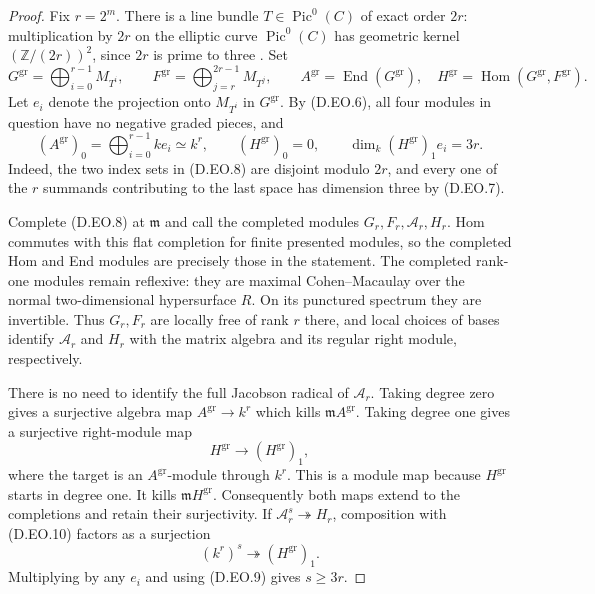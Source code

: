\begin{proof}
Fix $r=2^m$. There is a line bundle $T\in\operatorname{Pic}^0(C)$
of exact order $2r$: multiplication by $2r$ on the elliptic curve
$\operatorname{Pic}^0(C)$ has geometric kernel
$(\mathbb Z/(2r))^2$, since $2r$ is prime to three
\citep[Tag 03RP, Proposition 39.9.11(5)--(7), with proof]{StacksDEllipticOrder}.
Set
\[
 G^{\mathrm{gr}}=\bigoplus_{i=0}^{r-1}M_{T^i},
 \qquad F^{\mathrm{gr}}=\bigoplus_{j=r}^{2r-1}M_{T^j},
 \qquad A^{\mathrm{gr}}=\operatorname{End}(G^{\mathrm{gr}}),
 \quad H^{\mathrm{gr}}=\operatorname{Hom}(G^{\mathrm{gr}},F^{\mathrm{gr}}).
 \tag{D.EO.8}
\]
Let $e_i$ denote the projection onto $M_{T^i}$ in $G^{\mathrm{gr}}$.
By (D.EO.6), all four modules in question have no negative graded
pieces, and
\[
 (A^{\mathrm{gr}})_0=\bigoplus_{i=0}^{r-1}ke_i\simeq k^r,
 \qquad (H^{\mathrm{gr}})_0=0,
 \qquad
 \dim_k (H^{\mathrm{gr}})_1e_i=3r.
 \tag{D.EO.9}
\]
Indeed, the two index sets in (D.EO.8) are disjoint modulo $2r$,
and every one of the $r$ summands contributing to the last space
has dimension three by (D.EO.7).

Complete (D.EO.8) at $\mathfrak m$ and call the completed modules
$G_r,F_r,\mathcal A_r,H_r$. Hom commutes with this flat completion
for finite presented modules, so the completed Hom and End modules
are precisely those in the statement. The completed rank-one
modules remain reflexive: they are maximal Cohen--Macaulay over
the normal two-dimensional hypersurface $R$. On its punctured
spectrum they are invertible. Thus $G_r,F_r$ are locally free of
rank $r$ there, and local choices of bases identify
$\mathcal A_r$ and $H_r$ with the matrix algebra and its regular
right module, respectively.

There is no need to identify the full Jacobson radical of
$\mathcal A_r$. Taking degree zero gives a surjective algebra map
$A^{\mathrm{gr}}\to k^r$ which kills $\mathfrak m A^{\mathrm{gr}}$.
Taking degree one gives a surjective right-module map
\[
 H^{\mathrm{gr}}\longrightarrow (H^{\mathrm{gr}})_1,
 \tag{D.EO.10}
\]
where the target is an $A^{\mathrm{gr}}$-module through $k^r$.
This is a module map because $H^{\mathrm{gr}}$ starts in degree
one. It kills $\mathfrak m H^{\mathrm{gr}}$. Consequently both
maps extend to the completions and retain their surjectivity.
If $\mathcal A_r^s\twoheadrightarrow H_r$, composition with
(D.EO.10) factors as a surjection
\[
 (k^r)^s\twoheadrightarrow (H^{\mathrm{gr}})_1.
\]
Multiplying by any $e_i$ and using (D.EO.9) gives $s\ge3r$.


\end{proof}
